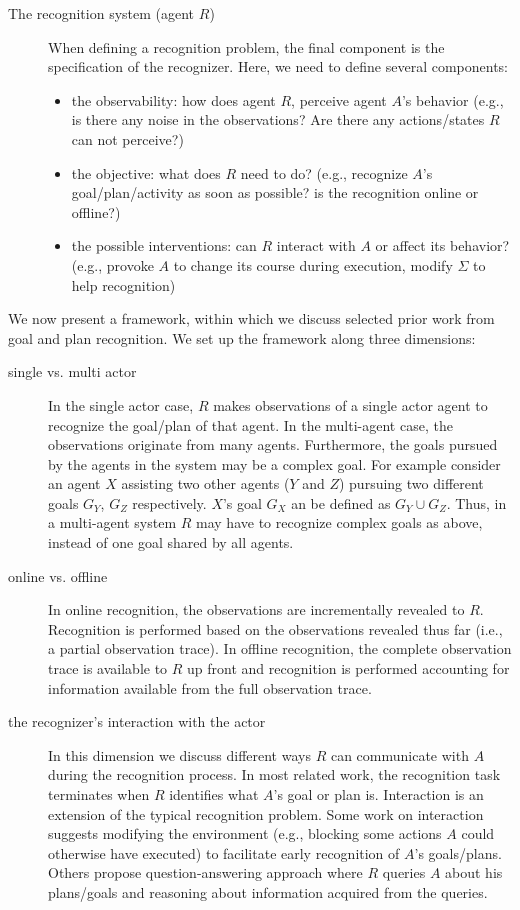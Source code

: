 \begin{description}
\item [The recognition system (agent $R$)] When defining a recognition problem, the final component is the specification of the recognizer. Here, we need to define several components: 
\begin{itemize}
\item the observability: how does agent $R$, perceive agent $A$'s behavior (e.g., is there any noise in the observations? Are there any actions/states $R$ can not perceive?)
\item the objective: what does $R$ need to do? (e.g., recognize $A$'s goal/plan/activity as soon as possible? is the recognition online or offline?)
\item the possible interventions: can $R$ interact with $A$ or affect its behavior? (e.g., provoke $A$ to change its course during execution, modify $\Sigma$ to help recognition)
\end{itemize}

\end{description}

We now present a framework, within which we discuss selected prior work from goal and plan recognition. We set up the framework along three dimensions:
\begin{description}
\item [single vs. multi actor] In the single actor case, $R$ makes observations of a single actor agent to recognize the goal/plan of that agent. In the multi-agent case, the observations originate from many agents. Furthermore, the goals pursued by the agents in the system may be a complex goal. For example consider an agent $X$ assisting two other agents ($Y$ and $Z$) pursuing two different goals $G_Y$, $G_Z$ respectively. $X$'s goal $G_X$ an be defined as $G_Y \cup G_Z$. Thus, in a multi-agent system $R$ may have to recognize complex goals as above, instead of one goal shared by all agents.
\item [online vs. offline] In online recognition, the observations are incrementally revealed to $R$. Recognition is performed based on the observations revealed thus far (i.e., a partial observation trace). In offline recognition, the complete observation trace is available to $R$ up front and recognition is performed accounting for information available from the full observation trace.

\item [the recognizer's interaction with the actor] In this dimension we discuss different ways $R$ can communicate with $A$ during the recognition process. In most related work, the recognition task terminates when $R$ identifies what $A$'s goal or plan is. Interaction is an extension of the typical recognition problem. Some work on interaction suggests modifying the environment (e.g., blocking some actions $A$ could otherwise have executed) to facilitate early recognition of $A$'s goals/plans. Others propose question-answering approach where $R$ queries $A$ about his plans/goals and reasoning about information acquired from the queries.
\end{description}

